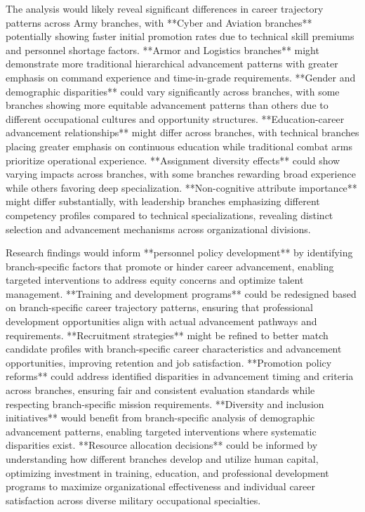 \documentclass[main.tex]{subfiles}
\begin{document}

The analysis would likely reveal significant differences in career trajectory patterns across Army branches, with **Cyber and Aviation branches** potentially showing faster initial promotion rates due to technical skill premiums and personnel shortage factors. **Armor and Logistics branches** might demonstrate more traditional hierarchical advancement patterns with greater emphasis on command experience and time-in-grade requirements. **Gender and demographic disparities** could vary significantly across branches, with some branches showing more equitable advancement patterns than others due to different occupational cultures and opportunity structures. **Education-career advancement relationships** might differ across branches, with technical branches placing greater emphasis on continuous education while traditional combat arms prioritize operational experience. **Assignment diversity effects** could show varying impacts across branches, with some branches rewarding broad experience while others favoring deep specialization. **Non-cognitive attribute importance** might differ substantially, with leadership branches emphasizing different competency profiles compared to technical specializations, revealing distinct selection and advancement mechanisms across organizational divisions.


Research findings would inform **personnel policy development** by identifying branch-specific factors that promote or hinder career advancement, enabling targeted interventions to address equity concerns and optimize talent management. **Training and development programs** could be redesigned based on branch-specific career trajectory patterns, ensuring that professional development opportunities align with actual advancement pathways and requirements. **Recruitment strategies** might be refined to better match candidate profiles with branch-specific career characteristics and advancement opportunities, improving retention and job satisfaction. **Promotion policy reforms** could address identified disparities in advancement timing and criteria across branches, ensuring fair and consistent evaluation standards while respecting branch-specific mission requirements. **Diversity and inclusion initiatives** would benefit from branch-specific analysis of demographic advancement patterns, enabling targeted interventions where systematic disparities exist. **Resource allocation decisions** could be informed by understanding how different branches develop and utilize human capital, optimizing investment in training, education, and professional development programs to maximize organizational effectiveness and individual career satisfaction across diverse military occupational specialties.
\end{document}
